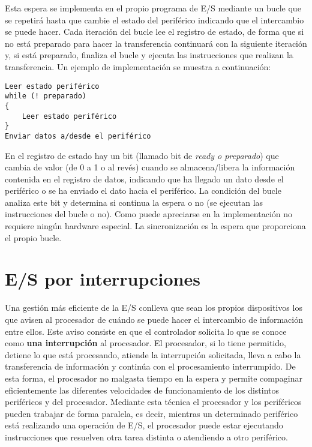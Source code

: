 Esta espera se  implementa en el propio programa  de E/S mediante  un bucle que se repetirá hasta que cambie el estado del periférico indicando que el intercambio se puede hacer.  Cada iteración del bucle lee el registro de estado, de forma que si no está preparado para hacer la transferencia continuará con la siguiente iteración  y, si está preparado, finaliza el bucle y ejecuta las instrucciones que realizan la transferencia. Un ejemplo de implementación se muestra  a continuación: 

\begin{verbatim}
Leer estado periférico
while (! preparado) 
{ 
	Leer estado periférico  
}
Enviar datos a/desde el periférico
\end{verbatim}

En el registro de estado hay un bit (llamado bit de \textit{ready o preparado}) que cambia de valor (de 0 a 1 o al revés) cuando se almacena/libera la información contenida en el registro de datos, indicando que ha llegado un dato desde el periférico  o se ha enviado el dato hacia el periférico.  La condición  del bucle analiza  este bit y  determina si continua la espera o no (se ejecutan las instrucciones del bucle o no). Como puede apreciarse en la implementación no requiere ningún hardware especial. La sincronización es la espera que proporciona el propio  bucle.

\section{E/S por interrupciones}
Una gestión más eficiente de la E/S conlleva que sean los propios dispositivos los que avisen al procesador de  cuándo se puede hacer  el intercambio de información entre ellos. Este aviso consiste en que el controlador  solicita lo que se conoce como  {\bf una interrupción} al procesador. El procesador, si lo tiene permitido, detiene lo que está procesando, atiende la interrupción solicitada, lleva a cabo la transferencia de información y continúa con el procesamiento interrumpido.  De esta forma, el procesador no malgasta tiempo en la espera y permite compaginar eficientemente las diferentes velocidades de funcionamiento de los distintos periféricos y del procesador. Mediante esta técnica el procesador y los periféricos pueden trabajar de forma paralela, es decir, mientras un determinado periférico está realizando una operación de E/S, el procesador puede estar ejecutando instrucciones que resuelven otra tarea distinta o atendiendo a otro periférico.

